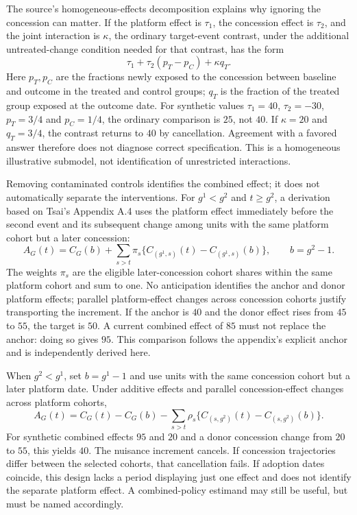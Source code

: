 The source's homogeneous-effects decomposition explains why ignoring the concession can matter. If the platform effect is
$\tau_1$, the concession effect is $\tau_2$, and the joint interaction is $\kappa$, the ordinary target-event contrast,
under the additional untreated-change condition needed for that contrast, has the form
\[
 \tau_1+\tau_2(p_T-p_C)+\kappa q_T.
\]
Here $p_T,p_C$ are the fractions newly exposed to the concession between baseline and outcome in the treated and control
groups; $q_T$ is the fraction of the treated group exposed at the outcome date. For synthetic values $\tau_1=40$,
$\tau_2=-30$, $p_T=3/4$ and $p_C=1/4$, the ordinary comparison is $25$, not $40$. If $\kappa=20$ and $q_T=3/4$,
the contrast returns to $40$ by cancellation. Agreement with a favored answer therefore does not diagnose correct
specification. This is a homogeneous illustrative submodel, not identification of unrestricted interactions.
\citep{exec28_panel_tsai,exec28_panel_reference}

Removing contaminated controls identifies the combined effect; it does not automatically separate the interventions.
For $g^1<g^2$ and $t\geq g^2$, a derivation based on Tsai's Appendix A.4 uses the platform effect immediately before the
second event and its subsequent change among units with the same platform cohort but a later concession:
\[
 A_G(t)=C_G(b)+\sum_{s>t}\pi_s\{C_{(g^1,s)}(t)-C_{(g^1,s)}(b)\},\qquad b=g^2-1.
\]
The weights $\pi_s$ are the eligible later-concession cohort shares within the same platform cohort and sum to one.
No anticipation identifies the anchor and donor platform effects; parallel platform-effect changes across concession
cohorts justify transporting the increment. If the anchor is $40$ and the donor effect rises from $45$ to $55$, the
target is $50$. A current combined effect of $85$ must not replace the anchor: doing so gives $95$.
This comparison follows the appendix's explicit anchor and is independently derived here.~\citep{exec28_panel_tsai,exec28_panel_reference}

When $g^2<g^1$, set $b=g^1-1$ and use units with the same concession cohort but a later platform date. Under additive
effects and parallel concession-effect changes across platform cohorts,
\[
 A_G(t)=C_G(t)-C_G(b)-\sum_{s>t}\rho_s\{C_{(s,g^2)}(t)-C_{(s,g^2)}(b)\}.
\]
For synthetic combined effects $95$ and $20$ and a donor concession change from $20$ to $55$, this yields $40$.
The nuisance increment cancels. If concession trajectories differ between the selected cohorts, that cancellation fails.
If adoption dates coincide, this design lacks a period displaying just one effect and does not identify the separate
platform effect. A combined-policy estimand may still be useful, but must be named accordingly.~\citep{exec28_panel_tsai,exec28_panel_reference}

